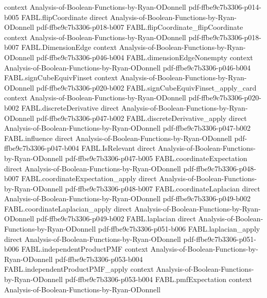 \begin{theorem}
  {context}
  {Analysis-of-Boolean-Functions-by-Ryan-ODonnell}
  {pdf-ffbe9c7b3306-p014-b005}
\proofstep
  {FABL.flipCoordinate}
  {direct}
  {Analysis-of-Boolean-Functions-by-Ryan-ODonnell}
  {pdf-ffbe9c7b3306-p018-b007}
\proofstep
  {FABL.flipCoordinate_flipCoordinate}
  {context}
  {Analysis-of-Boolean-Functions-by-Ryan-ODonnell}
  {pdf-ffbe9c7b3306-p018-b007}
\proofstep
  {FABL.DimensionEdge}
  {context}
  {Analysis-of-Boolean-Functions-by-Ryan-ODonnell}
  {pdf-ffbe9c7b3306-p046-b004}
\proofstep
  {FABL.dimensionEdgeNonempty}
  {context}
  {Analysis-of-Boolean-Functions-by-Ryan-ODonnell}
  {pdf-ffbe9c7b3306-p046-b004}
\proofstep
  {FABL.signCubeEquivFinset}
  {context}
  {Analysis-of-Boolean-Functions-by-Ryan-ODonnell}
  {pdf-ffbe9c7b3306-p020-b002}
\proofstep
  {FABL.signCubeEquivFinset_apply_card}
  {context}
  {Analysis-of-Boolean-Functions-by-Ryan-ODonnell}
  {pdf-ffbe9c7b3306-p020-b002}
\proofstep
  {FABL.discreteDerivative}
  {direct}
  {Analysis-of-Boolean-Functions-by-Ryan-ODonnell}
  {pdf-ffbe9c7b3306-p047-b002}
\proofstep
  {FABL.discreteDerivative_apply}
  {direct}
  {Analysis-of-Boolean-Functions-by-Ryan-ODonnell}
  {pdf-ffbe9c7b3306-p047-b002}
\proofstep
  {FABL.influence}
  {direct}
  {Analysis-of-Boolean-Functions-by-Ryan-ODonnell}
  {pdf-ffbe9c7b3306-p047-b004}
\proofstep
  {FABL.IsRelevant}
  {direct}
  {Analysis-of-Boolean-Functions-by-Ryan-ODonnell}
  {pdf-ffbe9c7b3306-p047-b005}
\proofstep
  {FABL.coordinateExpectation}
  {direct}
  {Analysis-of-Boolean-Functions-by-Ryan-ODonnell}
  {pdf-ffbe9c7b3306-p048-b007}
\proofstep
  {FABL.coordinateExpectation_apply}
  {direct}
  {Analysis-of-Boolean-Functions-by-Ryan-ODonnell}
  {pdf-ffbe9c7b3306-p048-b007}
\proofstep
  {FABL.coordinateLaplacian}
  {direct}
  {Analysis-of-Boolean-Functions-by-Ryan-ODonnell}
  {pdf-ffbe9c7b3306-p049-b002}
\proofstep
  {FABL.coordinateLaplacian_apply}
  {direct}
  {Analysis-of-Boolean-Functions-by-Ryan-ODonnell}
  {pdf-ffbe9c7b3306-p049-b002}
\proofstep
  {FABL.laplacian}
  {direct}
  {Analysis-of-Boolean-Functions-by-Ryan-ODonnell}
  {pdf-ffbe9c7b3306-p051-b006}
\proofstep
  {FABL.laplacian_apply}
  {direct}
  {Analysis-of-Boolean-Functions-by-Ryan-ODonnell}
  {pdf-ffbe9c7b3306-p051-b006}
\proofstep
  {FABL.independentProductPMF}
  {context}
  {Analysis-of-Boolean-Functions-by-Ryan-ODonnell}
  {pdf-ffbe9c7b3306-p053-b004}
\proofstep
  {FABL.independentProductPMF_apply}
  {context}
  {Analysis-of-Boolean-Functions-by-Ryan-ODonnell}
  {pdf-ffbe9c7b3306-p053-b004}
\proofstep
  {FABL.pmfExpectation}
  {context}
  {Analysis-of-Boolean-Functions-by-Ryan-ODonnell}

\end{theorem}
